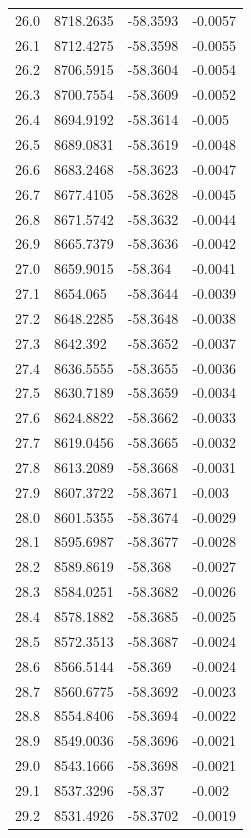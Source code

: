 \begin{table}[H]
\begin{tabular}{llll}
26.0 & 8718.2635 & -58.3593 & -0.0057 \\
26.1 & 8712.4275 & -58.3598 & -0.0055 \\
26.2 & 8706.5915 & -58.3604 & -0.0054 \\
26.3 & 8700.7554 & -58.3609 & -0.0052 \\
26.4 & 8694.9192 & -58.3614 & -0.005 \\
26.5 & 8689.0831 & -58.3619 & -0.0048 \\
26.6 & 8683.2468 & -58.3623 & -0.0047 \\
26.7 & 8677.4105 & -58.3628 & -0.0045 \\
26.8 & 8671.5742 & -58.3632 & -0.0044 \\
26.9 & 8665.7379 & -58.3636 & -0.0042 \\
27.0 & 8659.9015 & -58.364 & -0.0041 \\
27.1 & 8654.065 & -58.3644 & -0.0039 \\
27.2 & 8648.2285 & -58.3648 & -0.0038 \\
27.3 & 8642.392 & -58.3652 & -0.0037 \\
27.4 & 8636.5555 & -58.3655 & -0.0036 \\
27.5 & 8630.7189 & -58.3659 & -0.0034 \\
27.6 & 8624.8822 & -58.3662 & -0.0033 \\
27.7 & 8619.0456 & -58.3665 & -0.0032 \\
27.8 & 8613.2089 & -58.3668 & -0.0031 \\
27.9 & 8607.3722 & -58.3671 & -0.003 \\
28.0 & 8601.5355 & -58.3674 & -0.0029 \\
28.1 & 8595.6987 & -58.3677 & -0.0028 \\
28.2 & 8589.8619 & -58.368 & -0.0027 \\
28.3 & 8584.0251 & -58.3682 & -0.0026 \\
28.4 & 8578.1882 & -58.3685 & -0.0025 \\
28.5 & 8572.3513 & -58.3687 & -0.0024 \\
28.6 & 8566.5144 & -58.369 & -0.0024 \\
28.7 & 8560.6775 & -58.3692 & -0.0023 \\
28.8 & 8554.8406 & -58.3694 & -0.0022 \\
28.9 & 8549.0036 & -58.3696 & -0.0021 \\
29.0 & 8543.1666 & -58.3698 & -0.0021 \\
29.1 & 8537.3296 & -58.37 & -0.002 \\
29.2 & 8531.4926 & -58.3702 & -0.0019 \\

\end{tabular}
\end{table}
